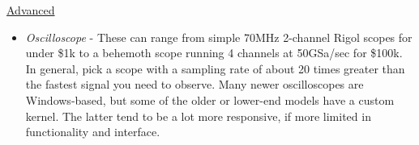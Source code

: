 \underline{Advanced}

\begin{itemize}
\item \emph{Oscilloscope} - These can range from simple 70MHz 2-channel Rigol scopes for under \$1k to a behemoth scope running 4 channels at 50GSa/sec for \$100k. In general, pick a scope with a sampling rate of about 20 times greater than the fastest signal you need to observe. Many newer oscilloscopes are Windows-based, but some of the older or lower-end models have a custom kernel. The latter tend to be a lot more responsive, if more limited in functionality and interface.

\end{itemize}


